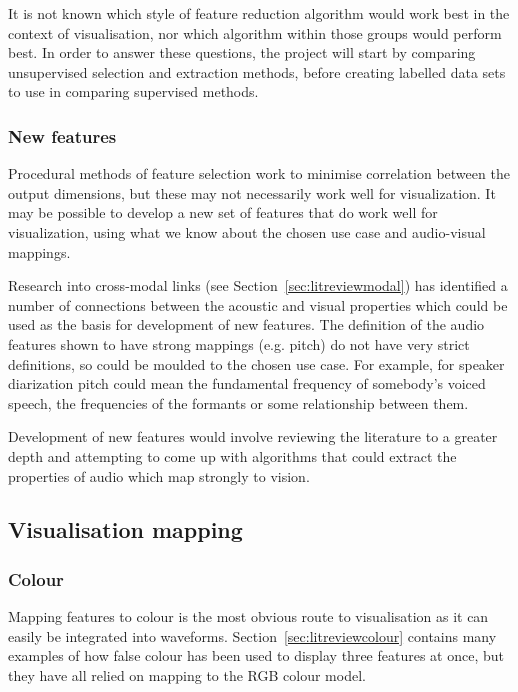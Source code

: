 It is not known which style of feature reduction algorithm would work best in
the context of visualisation, nor which algorithm within those groups would
perform best. In order to answer these questions, the project will start by
comparing unsupervised selection and extraction methods, before creating
labelled data sets to use in comparing supervised methods.

\subsubsection{New features}\label{sec:planfeatsnew}
Procedural methods of feature selection work to minimise correlation between
the output dimensions, but these may not necessarily work well for
visualization. It may be possible to develop a new set of features that do work
well for visualization, using what we know about the chosen use case and
audio-visual mappings.

Research into cross-modal links (see Section~\ref{sec:litreviewmodal}) has
identified a number of connections between the acoustic and visual properties
which could be used as the basis for development of new features. The
definition of the audio features shown to have strong mappings (e.g. pitch) do
not have very strict definitions, so could be moulded to the chosen use case.
For example, for speaker diarization pitch could mean the fundamental frequency
of somebody's voiced speech, the frequencies of the formants or some
relationship between them.

Development of new features would involve reviewing the literature to a greater
depth and attempting to come up with algorithms that could extract the
properties of audio which map strongly to vision.

\subsection{Visualisation mapping}\label{sec:planvismap}

\subsubsection{Colour}
Mapping features to colour is the most obvious route to visualisation as it
can easily be integrated into waveforms. Section~\ref{sec:litreviewcolour}
contains many examples of how false colour has been used to display three
features at once, but they have all relied on mapping to the RGB colour model.

